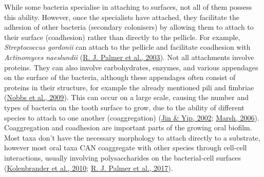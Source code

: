 \documentclass[
  letterpaper,
]{book}
\begin{document}
While some bacteria specialise in attaching to surfaces, not all of them
possess this ability. However, once the specialists have attached, they
facilitate the adhesion of other bacteria (secondary colonisers) by
allowing them to attach to their surface (coadhesion) rather than
directly to the pellicle. For example, \emph{Streptococcus gordonii} can
attach to the pellicle and facilitate coadhesion with \emph{Actinomyces
naeslundii}
(\protect\hyperlink{ref-palmerCoaggregationInteractions2003}{R. J.
Palmer et al., 2003}). Not all attachments involve proteins. They can
also involve carbohydrates, enzymes, and various appendages on the
surface of the bacteria, although these appendages often consist of
proteins in their structure, for example the already mentioned pili and
fimbriae (\protect\hyperlink{ref-nobbsStreptococcusAdherence2009}{Nobbs
et al., 2009}). This can occur on a large scale, causing the number and
types of bacteria on the tooth surface to grow, due to the ability of
different species to attach to one another (coaggregation)
(\protect\hyperlink{ref-jinSupragingivalCalculus2002}{Jin \& Yip, 2002};
\protect\hyperlink{ref-marshDentalPlaque2006}{Marsh, 2006}).
Coaggregation and coadhesion are important parts of the growing oral
biofilm. Most taxa don't have the necessary morphology to attach
directly to a substrate, however most oral taxa CAN coaggregate with
other species through cell-cell interactions, usually involving
polysaccharides on the bacterial-cell surfaces
(\protect\hyperlink{ref-kolenbranderOralMultispecies2010}{Kolenbrander
et al., 2010};
\protect\hyperlink{ref-palmerInterbacterialAdhesion2017}{R. J. Palmer et
al., 2017}).
\end{document}
